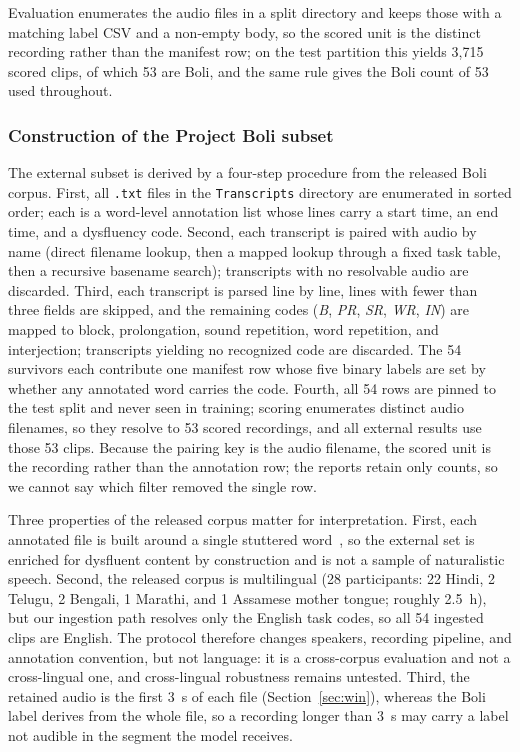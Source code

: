 \documentclass[a4paper,orivec]{llncs}
\begin{document}
Evaluation enumerates the audio files in a split directory and keeps those with a
matching label CSV and a non-empty body, so the scored unit is the distinct
recording rather than the manifest row; on the test partition this yields 3{,}715
scored clips, of which 53 are Boli, and the same rule gives the Boli count of 53
used throughout.

\subsubsection{Construction of the Project Boli subset}
\label{sec:boli}
The external subset is derived by a four-step procedure from the released Boli
corpus. First, all \texttt{.txt} files in the \texttt{Transcripts} directory are
enumerated in sorted order; each is a word-level annotation list whose lines carry
a start time, an end time, and a dysfluency code. Second, each transcript is
paired with audio by name (direct filename lookup, then a mapped lookup through a
fixed task table, then a recursive basename search); transcripts with no
resolvable audio are discarded. Third, each transcript is parsed line by line,
lines with fewer than three fields are skipped, and the remaining codes
(\emph{B}, \emph{PR}, \emph{SR}, \emph{WR}, \emph{IN}) are mapped to block,
prolongation, sound repetition, word repetition, and interjection; transcripts
yielding no recognized code are discarded. The 54 survivors each contribute one
manifest row whose five binary labels are set by whether any annotated word
carries the code. Fourth, all 54 rows are pinned to the test split and never seen
in training; scoring enumerates distinct audio filenames, so they resolve to 53
scored recordings, and all external results use those 53 clips. Because the
pairing key is the audio filename, the scored unit is the recording rather than
the annotation row; the reports retain only counts, so we cannot say which filter
removed the single row.

Three properties of the released corpus matter for interpretation. First, each
annotated file is built around a single stuttered word~\cite{boli2025}, so the
external set is enriched for dysfluent content by construction and is not a
sample of naturalistic speech. Second, the released corpus is multilingual (28
participants: 22 Hindi, 2 Telugu, 2 Bengali, 1 Marathi, and 1 Assamese mother
tongue; roughly 2.5~h), but our ingestion path resolves only the English task
codes, so all 54 ingested clips are English. The protocol therefore changes
speakers, recording pipeline, and annotation convention, but not language: it is
a cross-corpus evaluation and not a cross-lingual one, and cross-lingual
robustness remains untested. Third, the retained audio is the first 3~s of each
file (Section~\ref{sec:win}), whereas the Boli label derives from the whole file,
so a recording longer than 3~s may carry a label not audible in the segment the
model receives.
\end{document}
